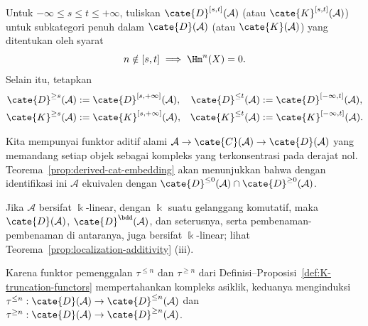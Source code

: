 \begin{definisi}
	Untuk $-\infty \leq s \leq t \leq +\infty$, tuliskan
	$\cate{D}^{[s,t]}(\mathcal{A})$ (atau $\cate{K}^{[s, t]}(\mathcal{A})$)
	untuk subkategori penuh dalam $\cate{D}(\mathcal{A})$ (atau
	$\cate{K}(\mathcal{A})$) yang ditentukan oleh syarat
	\[ n \notin [s, t] \implies \Hm^n(X) = 0 . \]
	Selain itu, tetapkan
	\begin{align*}
		\cate{D}^{\geq s}(\mathcal{A}) & := \cate{D}^{[s, +\infty]}(\mathcal{A}), &
		\cate{D}^{\leq t}(\mathcal{A}) & := \cate{D}^{[-\infty, t]}(\mathcal{A}), \\
		\cate{K}^{\geq s}(\mathcal{A}) & := \cate{K}^{[s, +\infty]}(\mathcal{A}), &
		\cate{K}^{\leq t}(\mathcal{A}) & := \cate{K}^{[-\infty, t]}(\mathcal{A}).
	\end{align*}
\end{definisi}

Kita mempunyai funktor aditif alami
$\mathcal{A} \to \cate{C}(\mathcal{A}) \to \cate{D}(\mathcal{A})$ yang
memandang setiap objek sebagai kompleks yang terkonsentrasi pada derajat nol.
Teorema~\ref{prop:derived-cat-embedding} akan menunjukkan bahwa dengan
identifikasi ini $\mathcal{A}$ ekuivalen dengan
$\cate{D}^{\leq 0}(\mathcal{A}) \cap \cate{D}^{\geq 0}(\mathcal{A})$.

\begin{catatan}
	Jika $\mathcal{A}$ bersifat $\Bbbk$-linear, dengan $\Bbbk$ suatu gelanggang
	komutatif, maka $\cate{D}(\mathcal{A})$, $\cate{D}^{\bdd}(\mathcal{A})$,
	dan seterusnya, serta pembenaman-pembenaman di antaranya, juga bersifat
	$\Bbbk$-linear; lihat Teorema~\ref{prop:localization-additivity} (iii).
\end{catatan}

Karena funktor pemenggalan $\tau^{\leq n}$ dan $\tau^{\geq n}$ dari
Definisi--Proposisi~\ref{def:K-truncation-functors} mempertahankan kompleks
asiklik, keduanya menginduksi
$\tau^{\leq n}: \cate{D}(\mathcal{A}) \to \cate{D}^{\leq n}(\mathcal{A})$
dan
$\tau^{\geq n}: \cate{D}(\mathcal{A}) \to \cate{D}^{\geq n}(\mathcal{A})$.


